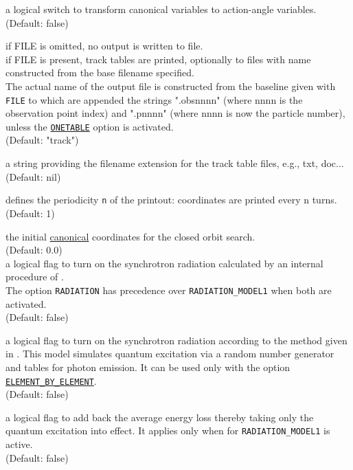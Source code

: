 \begin{madlist}
    a logical switch to transform canonical variables
   to action-angle variables. \\ (Default: false) 

    if FILE is omitted, no output is written to file.\\
   if FILE is present, track tables are printed, optionally to 
   files with name constructed from the base filename specified. \\
   The actual name of the output file is constructed from
   the baseline given with \texttt{FILE} to which are appended the
   strings ".obsnnnn" (where nnnn is the observation point index) and
   ".pnnnn" (where nnnn is now the particle number), unless the
   \hyperref[opt:onetable]{\texttt{ONETABLE}} option is activated.  \\
   (Default: "track") 

    a string providing the filename extension for the
   track table files, e.g., txt, doc...  \\ (Default: nil)

    defines the periodicity \texttt{n} of the printout:
   coordinates are printed every n turns. \\ (Default: 1)

    the initial
   \hyperref[subsec:tables-canon]{canonical} coordinates for the closed orbit search. \\ (Default: 0.0) \\

   \label{opt:radiation} a logical flag to turn on
     the synchrotron radiation calculated by an internal procedure of
     \ptc. \\
     The option \texttt{RADIATION} has precedence over \texttt{RADIATION\_MODEL1}
     when both are activated. 
     \\ (Default: false)

    a logical flag to turn on the synchrotron
   radiation according to the method given in \cite{roy1990}. This model
   simulates quantum excitation via a random number generator and tables
   for photon emission. It can be used only with the option
   \hyperref[opt:element-by-element]{\texttt{ELEMENT\_BY\_ELEMENT}}.\\ 
   (Default: false) 

    a logical flag to add back the
   average energy loss thereby taking only the quantum excitation into
   effect. It applies only when for \texttt{RADIATION\_MODEL1} is
   active.\\
   (Default: false)


\end{madlist}
